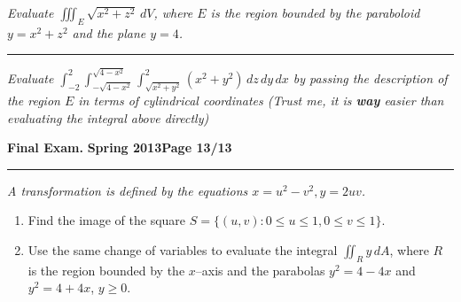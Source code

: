 \documentclass[12pt]{article}
\begin{document}
\bigskip
{\problem[10 pts] \em Evaluate $\iiint_E \sqrt{x^2+z^2}\, dV$, where
  $E$ is the region bounded by the paraboloid $y=x^2+z^2$ and the
  plane $y=4$.}
\vspace{8cm}
\begin{flushright}
\end{flushright}
\hrule
{\problem[15 pts] \em Evaluate $\int_{-2}^2
  \int_{-\sqrt{4-x^2}}^{\sqrt{4-x^2}} \int_{\sqrt{x^2+y^2}}^2
  (x^2+y^2)\, dz\, dy\, dx$ by passing the description of the region
  $E$ in terms of cylindrical coordinates (Trust me, it is
  \textbf{way} easier than evaluating the integral above directly)}
\vspace{8cm}
\begin{flushright}
\end{flushright}
\newpage

\hfill{\large\bf Final Exam.}\hfill{\large\bf
  Spring 2013}\hfill{\large\bf Page 13/13}\hrule

\bigskip
{\problem[20 pts] \em A transformation is defined by the equations
  $x=u^2-v^2, y=2uv$.}
\begin{enumerate}
\item Find the image of the square $S=\big\{ (u,v) : 0 \leq u \leq 1,
  0 \leq v \leq 1 \big\}$.
\item Use the same change of variables to evaluate the integral
  $\iint_R y\, dA$, where $R$ is the region bounded by the $x$--axis
  and the parabolas $y^2=4-4x$ and $y^2=4+4x$, $y\geq 0$.
\end{enumerate}
\vspace{14.5cm}
\begin{flushright}
\end{flushright}
\end{document}
